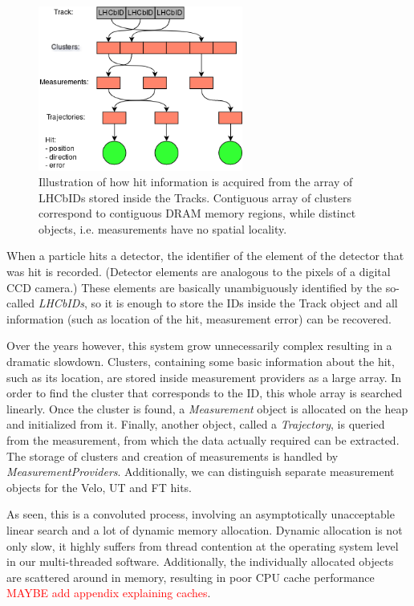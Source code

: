 \documentclass[12pt]{article}
\begin{document}
\begin{figure}[H]
	\begin{center}
		\includegraphics[width=0.6\textwidth]{kalmanfit_loadhits_schematic}
	\end{center}
	\caption{Illustration of how hit information is acquired from the array of LHCbIDs stored inside the Tracks. Contiguous array of clusters correspond to contiguous DRAM memory regions, while distinct objects, i.e. measurements have no spatial locality.}
	\label{fig_kalmanfit_loadhits_schematic}
\end{figure}

When a particle hits a detector, the identifier of the element of the detector that was hit is recorded. (Detector elements are analogous to the pixels of a digital CCD camera.) These elements are basically unambiguously identified by the so-called \textit{LHCbIDs}, so it is enough to store the IDs inside the Track object and all information (such as location of the hit, measurement error) can be recovered. 

Over the years however, this system grow unnecessarily complex resulting in a dramatic slowdown. Clusters, containing some basic information about the hit, such as its location, are stored inside measurement providers as a large array. In order to find the cluster that corresponds to the ID, this whole array is searched linearly. Once the cluster is found, a \textit{Measurement} object is allocated on the heap and initialized from it. Finally, another object, called a \textit{Trajectory}, is queried from the measurement, from which the data actually required can be extracted. The storage of clusters and creation of measurements is handled by \textit{MeasurementProviders}. Additionally, we can distinguish separate measurement objects for the Velo, UT and FT hits.

As seen, this is a convoluted process, involving an asymptotically unacceptable linear search and a lot of dynamic memory allocation. Dynamic allocation is not only slow, it highly suffers from thread contention at the operating system level in our multi-threaded software. Additionally, the individually allocated objects are scattered around in memory, resulting in poor CPU cache performance \textcolor{red}{MAYBE add appendix explaining caches}.
\end{document}
